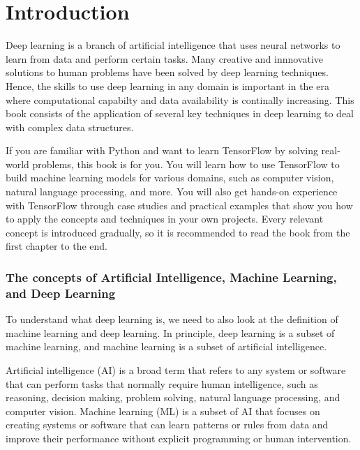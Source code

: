 \documentclass[
  letterpaper,
  DIV=11,
  numbers=noendperiod]{scrreprt}
\begin{document}

\hypertarget{introduction}{%
\chapter*{Introduction}\label{introduction}}


Deep learning is a branch of artificial intelligence that uses neural
networks to learn from data and perform certain tasks. Many creative and
innnovative solutions to human problems have been solved by deep
learning techniques. Hence, the skills to use deep learning in any
domain is important in the era where computational capabilty and data
availability is continally increasing. This book consists of the
application of several key techniques in deep learning to deal with
complex data structures.

If you are familiar with Python and want to learn TensorFlow by solving
real-world problems, this book is for you. You will learn how to use
TensorFlow to build machine learning models for various domains, such as
computer vision, natural language processing, and more. You will also
get hands-on experience with TensorFlow through case studies and
practical examples that show you how to apply the concepts and
techniques in your own projects. Every relevant concept is introduced
gradually, so it is recommended to read the book from the first chapter
to the end.

\hypertarget{the-concepts-of-artificial-intelligence-machine-learning-and-deep-learning}{%
\subsection*{The concepts of Artificial Intelligence, Machine Learning,
and Deep
Learning}\label{the-concepts-of-artificial-intelligence-machine-learning-and-deep-learning}}

To understand what deep learning is, we need to also look at the
definition of machine learning and deep learning. In principle, deep
learning is a subset of machine learning, and machine learning is a
subset of artificial intelligence.

Artificial intelligence (AI) is a broad term that refers to any system
or software that can perform tasks that normally require human
intelligence, such as reasoning, decision making, problem solving,
natural language processing, and computer vision. Machine learning (ML)
is a subset of AI that focuses on creating systems or software that can
learn patterns or rules from data and improve their performance without
explicit programming or human intervention.
\end{document}
